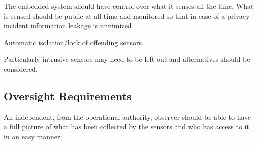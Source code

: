 The embedded system should have control over what it senses all the time.
What is sensed should be public at all time and monitored so that in case of a privacy incident information leakage is minimized

Automatic isolation/lock of offending sensors.

Particularly intrusive sensors may need to be left out and alternatives should be considered.



\subsection{Oversight Requirements}

An independent, from the operational authority, observer should be able to have a full picture of what has been collected by the sensors and who has access to it in an easy manner.
